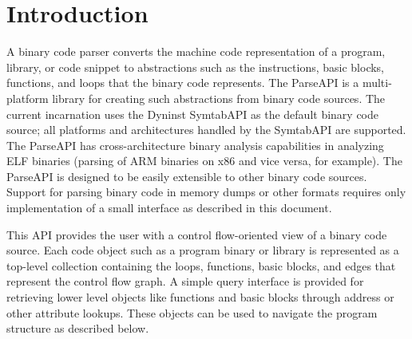 \section{Introduction}
\label{sec:intro}

A binary code parser converts the machine code representation of a program,
library, or code snippet to abstractions such as the instructions, basic
blocks, functions, and loops that the binary code represents. The ParseAPI is a
multi-platform library for creating such abstractions from binary code sources.
The current incarnation uses the Dyninst SymtabAPI as the default binary code
source; all platforms and architectures handled by the SymtabAPI are supported.
The ParseAPI has cross-architecture binary analysis capabilities in analyzing
ELF binaries (parsing of ARM binaries on x86 and vice versa, for example).
The ParseAPI is designed to be easily extensible to other binary code sources.
Support for parsing binary code in memory dumps or other formats requires only
implementation of a small interface as described in this document.

This API provides the user with a control flow-oriented view of a binary code
source. Each code object such as a program binary or library is represented as
a top-level collection containing the loops, functions, basic blocks, and edges that
represent the control flow graph. A simple query interface is provided for
retrieving lower level objects like functions and basic blocks through address
or other attribute lookups. These objects can be used to navigate the program
structure as described below.
